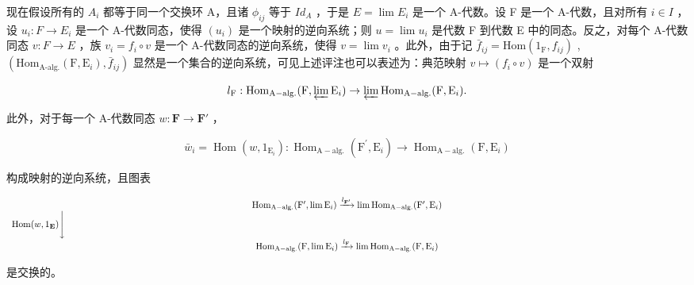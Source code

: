 现在假设所有的 \(A_{i}\) 都等于同一个交换环 A，且诸 \(\phi_{ij}\) 等于 \(Id_{A}\) ，于是 \(E = \lim E_{i}\) 是一个 A-代数。设 F 是一个 A-代数，且对所有 \(i \in I\) ，设 \(u_{i}: F \to E_{i}\) 是一个 A-代数同态，使得 \((u_{i})\) 是一个映射的逆向系统；则 \(u = \lim u_{i}\) 是代数 F 到代数 E 中的同态。反之，对每个 A-代数同态 \(v: F \to E\) ，族 \(v_{i} = f_{i} \circ v\) 是一个 A-代数同态的逆向系统，使得 \(v = \lim v_{i}\) 。此外，由于记 \(\bar{f}_{ij} = \text{Hom}(1_{\text{F}}, f_{ij})\) , \((\text{Hom}_{\text{A-alg.}}(\text{F}, \text{E}_i), \bar{f}_{ij})\) 显然是一个集合的逆向系统，可见上述评注也可以表述为：典范映射 \(v \mapsto (f_i \circ v)\) 是一个双射

\[
l _ {\mathrm{F}}: \operatorname{Hom} _ {\mathrm{A-alg.}} (\mathrm{F}, \varprojlim \mathrm{E} _ {i}) \rightarrow \varprojlim \operatorname{Hom} _ {\mathrm{A-alg.}} (\mathrm{F}, \mathrm{E} _ {i}).
\]

此外，对于每一个 A-代数同态 \(w: \mathbf{F} \to \mathbf{F}'\) ，

\[
\bar {w} _ {i} = \operatorname{Hom} (w, 1 _ {\mathrm{E} _ {i}}): \operatorname{Hom} _ {\mathrm{A-alg.}} (\mathrm{F} ^ {\prime}, \mathrm{E} _ {i}) \rightarrow \operatorname{Hom} _ {\mathrm{A-alg.}} (\mathrm{F}, \mathrm{E} _ {i})
\]

构成映射的逆向系统，且图表

\[
\begin{array}{c} \operatorname{Hom} _ {\mathrm{A-alg.}} (\mathrm{F} ^ {\prime}, \lim \mathrm{E} _ {i}) \xrightarrow {l _ {\mathbf {F} ^ {\prime}}} \lim \operatorname{Hom} _ {\mathrm{A-alg.}} (\mathrm{F} ^ {\prime}, \mathrm{E} _ {i}) \\ \operatorname{Hom} (w, 1 _ {\mathbf {E}}) \Biggl \downarrow \qquad \qquad \qquad \qquad \qquad \qquad \qquad \qquad \qquad \qquad \qquad \qquad \qquad \qquad \qquad \qquad \qquad \qquad \qquad \qquad \qquad \qquad \qquad \qquad \qquad \qquad \qquad \qquad \qquad \qquad \qquad \qquad \qquad \qquad \\ \operatorname{Hom} _ {\mathrm{A-alg.}} (\mathrm{F}, \lim \mathrm{E} _ {i}) \xrightarrow {l _ {\mathbf {F}}} \lim \operatorname{Hom} _ {\mathrm{A-alg.}} (\mathrm{F}, \mathrm{E} _ {i}) \end{array}
\]

是交换的。


